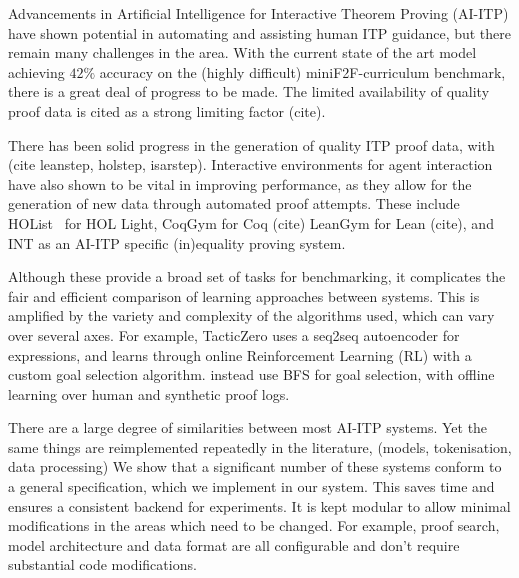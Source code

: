 \documentclass[letterpaper]{article} %
\begin{document}
    Advancements in Artificial Intelligence for Interactive Theorem Proving (AI-ITP) have shown potential in automating
    and assisting human ITP guidance, but there remain many challenges in the area.
    With the current state of the art model achieving $42\%$ accuracy on the (highly difficult) miniF2F-curriculum benchmark,
    there is a great deal of progress to be made.
    The limited availability of quality proof data is cited as a strong limiting factor (cite).

    There has been solid progress in the generation of quality ITP proof data, with (cite leanstep, holstep, isarstep).
    Interactive environments for agent interaction have also shown to be vital in improving performance,
    as they allow for the generation of new data through automated proof attempts.
    These include HOList~\cite{bansal_holist_2019} for HOL Light, CoqGym for Coq (cite)
    LeanGym for Lean (cite), and INT as an AI-ITP specific (in)equality proving system.

    Although these provide a broad set of tasks for benchmarking,
    it complicates the fair and efficient comparison of learning approaches between systems.
    This is amplified by the variety and complexity of the algorithms used, which can vary over several axes.
    For example, TacticZero \cite{wu_tacticzero_2021} uses a seq2seq autoencoder for expressions,
    and learns through online Reinforcement Learning (RL) with a custom goal selection algorithm.
    \cite{bansal_holist_2019} instead use BFS for goal selection,
    with offline learning over human and synthetic proof logs.

    There are a large degree of similarities between most AI-ITP systems.
    Yet the same things are reimplemented repeatedly in the literature, (models, tokenisation, data processing)
    We show that a significant number of these systems conform to a general specification,
    which we implement in our system. This saves time and ensures a consistent backend for experiments.
    It is kept modular to allow minimal modifications in the areas which need to be changed. For example, proof search,
    model architecture and data format are all configurable and don't require substantial code modifications.
\end{document}
